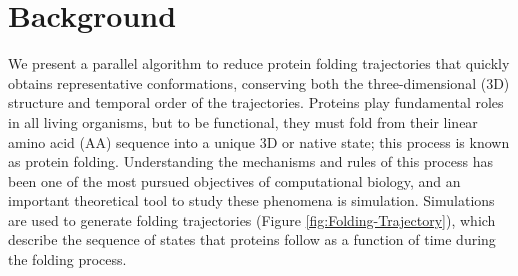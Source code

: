\documentclass[twocolumn]{bmcart}%
\begin{document}
\begin{frontmatter}
\begin{fmbox}
\begin{abstractbox}

\begin{keyword}
\end{keyword}


\end{abstractbox}
%
\end{fmbox}%

\end{frontmatter}



\section*{Background}

We present a parallel algorithm to reduce protein folding trajectories that quickly obtains representative conformations, conserving both the three-dimensional (3D) structure and temporal order of the trajectories. Proteins play fundamental roles in all living organisms, but to be functional, they must fold from their linear amino acid (AA) sequence into a unique 3D or native state; this process is known as protein folding. Understanding the mechanisms and rules of this process has been one of the most pursued objectives of computational biology, and an important theoretical tool to study these phenomena is simulation. Simulations are used to generate folding trajectories (Figure \ref{fig:Folding-Trajectory}), which describe the sequence of states that proteins follow as a function of time during the folding process.
\end{document}
